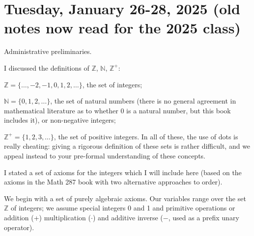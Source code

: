\documentclass[12pt]{article}
\begin{document}
\newpage


\section{Tuesday, January 26-28, 2025 (old notes now read for the 2025 class)}

Administrative preliminaries.


I discussed the definitions of ${\mathbb Z}$, ${\mathbb N}$, ${\mathbb Z}^+$: 

${\mathbb Z} = \{\ldots,-2,-1,0,1,2,\ldots\}$, the set of integers;

${\mathbb N}= \{0,1,2,\ldots\}$, the set of natural numbers (there is no general agreement in mathematical literature as to whether 0 is a natural number, but this book includes it), or non-negative integers;

${\mathbb Z}^+ = \{1,2,3,\ldots\}$, the set of positive integers.  In all of these, the use of dots is really cheating:  giving a rigorous definition of these sets is rather difficult, and we appeal instead to your pre-formal understanding of these concepts.

I stated a set of axioms for the integers which I will include here (based on the axioms in the Math 287 book with two alternative approaches to order).

We begin with a set of purely algebraic axioms.  Our variables range over the set $\mathbb Z$ of integers;  we assume special integers 0 and 1 and primitive operations or addition (+) multiplication ($\cdot$) and additive inverse ($-$, used as a prefix unary operator).
\end{document}
